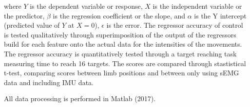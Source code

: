 \documentclass[landscape,a0paper,fontscale=0.37]{baposter} %
\begin{document}
\begin{poster}
{where $Y$ is the dependent variable or response, $X$ is the independent variable or the predictor, $\beta$ is the regression coefficient or the slope, and $\alpha$ is the Y intercept (predicted value of $Y$ at $X = 0$),  $\epsilon$ is the error.
The regressor accuracy of control is tested qualitatively through superimposition of the output of the regressors build for each feature onto the actual data for the intensities of the movements. The regressor accuracy is quantitatively tested through a target reaching task measuring time to reach 16 targets. The scores are compared through stastistical t-test, comparing scores between limb positions and between only using sEMG data and including IMU data. \vspace{0.5cm}

All data processing is performed in Matlab (2017). 
}


\end{poster}
\end{document}
